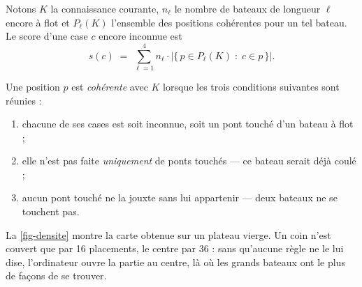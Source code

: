 Notons $K$ la connaissance courante, $n_\ell$ le nombre de bateaux de longueur $\ell$ encore
à flot et $P_\ell(K)$ l'ensemble des positions cohérentes pour un tel bateau. Le score
d'une case $c$ encore inconnue est
\begin{equation}
    s(c) \;=\; \sum_{\ell = 1}^{4} n_\ell \cdot
    \bigl|\{\, p \in P_\ell(K) \;:\; c \in p \,\}\bigr| .
    \label{eq-densite}
\end{equation}

Une position $p$ est \emph{cohérente} avec $K$ lorsque les trois conditions suivantes sont
réunies :

\begin{enumerate}
    \item chacune de ses cases est soit inconnue, soit un pont touché d'un bateau à flot ;
    \item elle n'est pas faite \emph{uniquement} de ponts touchés --- ce bateau serait déjà
          coulé ;
    \item aucun pont touché ne la jouxte sans lui appartenir --- deux bateaux ne se touchent
          pas.
\end{enumerate}

La \cref{fig-densite} montre la carte obtenue sur un plateau vierge. Un coin n'est couvert
que par 16 placements, le centre par 36 : sans qu'aucune règle ne le lui dise, l'ordinateur
ouvre la partie au centre, là où les grands bateaux ont le plus de façons de se trouver.


